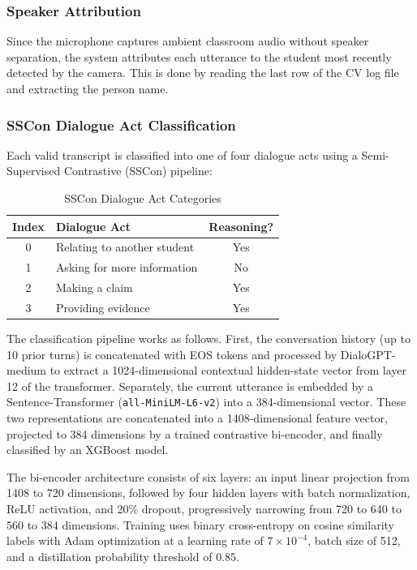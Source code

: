\documentclass[conference]{IEEEtran}
\begin{document}
\subsubsection{Speaker Attribution}
Since the microphone captures ambient classroom audio without speaker separation, the system attributes each utterance to the student most recently detected by the camera. This is done by reading the last row of the CV log file and extracting the person name.

\subsubsection{SSCon Dialogue Act Classification}
Each valid transcript is classified into one of four dialogue acts using a Semi-Supervised Contrastive (SSCon) pipeline:

\begin{table}[htbp]
\caption{SSCon Dialogue Act Categories}
\begin{center}
\begin{tabular}{|c|l|c|}
\hline
\textbf{Index} & \textbf{Dialogue Act} & \textbf{Reasoning?} \\
\hline
0 & Relating to another student & Yes \\
1 & Asking for more information & No \\
2 & Making a claim & Yes \\
3 & Providing evidence & Yes \\
\hline
\end{tabular}
\label{tab:acts}
\end{center}
\end{table}

The classification pipeline works as follows. First, the conversation history (up to 10 prior turns) is concatenated with EOS tokens and processed by DialoGPT-medium to extract a 1024-dimensional contextual hidden-state vector from layer 12 of the transformer. Separately, the current utterance is embedded by a Sentence-Transformer (\texttt{all-MiniLM-L6-v2}) into a 384-dimensional vector. These two representations are concatenated into a 1408-dimensional feature vector, projected to 384 dimensions by a trained contrastive bi-encoder, and finally classified by an XGBoost model.

The bi-encoder architecture consists of six layers: an input linear projection from 1408 to 720 dimensions, followed by four hidden layers with batch normalization, ReLU activation, and 20\% dropout, progressively narrowing from 720 to 640 to 560 to 384 dimensions. Training uses binary cross-entropy on cosine similarity labels with Adam optimization at a learning rate of $7 \times 10^{-4}$, batch size of 512, and a distillation probability threshold of 0.85.
\end{document}
